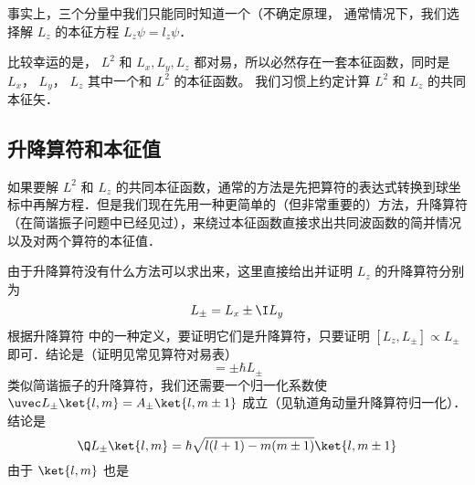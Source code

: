 事实上，三个分量中我们只能同时知道一个（不确定原理，%
通常情况下，我们选择解 $L_z$ 的本征方程 $L_z \psi = l_z\psi$． 

比较幸运的是， $L^2$ 和 $L_x, L_y, L_z$ 都对易，所以必然存在一套本征函数，同时是 $L_x$， $L_y$，  $L_z$ 其中一个和 $L^2$ 的本征函数。 我们习惯上约定计算 $L^2$ 和 $L_z$ 的共同本征矢．

\subsection{升降算符和本征值}

如果要解 $L^2$ 和 $L_z$ 的共同本征函数，通常的方法是先把算符的表达式转换到球坐标中再解方程．但是我们现在先用一种更简单的（但非常重要的）方法，升降算符（在简谐振子问题中已经见过），来绕过本征函数直接求出共同波函数的简并情况以及对两个算符的本征值．

由于升降算符没有什么方法可以求出来，这里直接给出并证明 $L_z$ 的升降算符分别为
\begin{equation}
L_\pm = L_x \pm \I L_y
\end{equation}
根据升降算符%
中的一种定义，要证明它们是升降算符，只要证明 $[L_z, L_\pm] \propto L_\pm$ 即可．结论是（证明见常见算符对易表）%
\begin{equation}
[L_z, L_\pm] =  \pm \hbar L_ \pm
\end{equation}
类似简谐振子的升降算符，我们还需要一个归一化系数使 $\uvec L_\pm \ket{l,m} = A_ \pm \ket{l,m \pm 1}$ 成立（见轨道角动量升降算符归一化）．结论是
\begin{equation}
\Q L_\pm \ket{l, m}  = \hbar \sqrt{l(l + 1) - m(m \pm 1)} \ket{l, m \pm 1} 
\end{equation}
由于 $\ket{l,m}$ 也是



